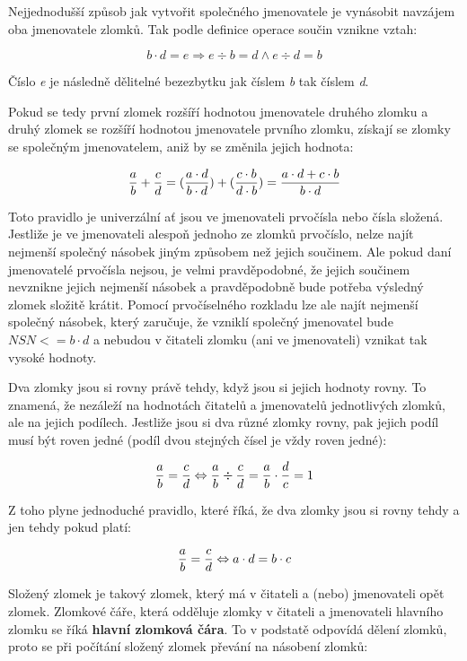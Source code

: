 Nejjednodušší způsob jak vytvořit společného jmenovatele je vynásobit navzájem oba jmenovatele zlomků. Tak podle definice operace součin vznikne vztah:

$$ b \cdot d = e \Rightarrow e \div b = d \wedge e \div d = b $$

Číslo {\it e} je následně dělitelné bezezbytku jak číslem {\it b} tak číslem {\it d}.

Pokud se tedy první zlomek rozšíří hodnotou jmenovatele druhého zlomku a druhý zlomek se rozšíří hodnotou jmenovatele prvního zlomku, získají se zlomky se společným jmenovatelem, aniž by se změnila jejich hodnota:

$$ {a \over b} + {c \over d} = ({a \cdot d \over b\cdot d}) + ({c \cdot b \over d \cdot b}) = {a \cdot d + c \cdot b \over b \cdot d}$$

Toto pravidlo je univerzální ať jsou ve jmenovateli prvočísla nebo čísla složená. Jestliže je ve jmenovateli alespoň jednoho ze zlomků prvočíslo, nelze najít nejmenší společný násobek jiným způsobem než jejich součinem. Ale pokud daní jmenovatelé prvočísla nejsou, je velmi pravděpodobné, že jejich součinem nevznikne jejich nejmenší násobek a pravděpodobně bude potřeba výsledný zlomek složitě krátit. Pomocí prvočíselného rozkladu lze ale najít nejmenší společný násobek, který zaručuje, že vzniklí společný jmenovatel bude $NSN <= b\cdot d$ a nebudou v čitateli zlomku (ani ve jmenovateli) vznikat tak vysoké hodnoty.


Dva zlomky jsou si rovny právě tehdy, když jsou si jejich hodnoty rovny. To znamená, že nezáleží na hodnotách čitatelů a jmenovatelů jednotlivých zlomků, ale na jejich podílech. Jestliže jsou si dva různé zlomky rovny, pak jejich podíl musí být roven jedné (podíl dvou stejných čísel je vždy roven jedné):

$$ {a \over b} = {c \over d} \Leftrightarrow  {a \over b} \div {c \over d} = {a \over b} \cdot {d \over c} = 1 $$

Z toho plyne jednoduché pravidlo, které říká, že dva zlomky jsou si rovny tehdy a jen tehdy pokud platí:

$$ {a \over b} = {c \over d} \Leftrightarrow a\cdot d = b \cdot c $$


Složený zlomek je takový zlomek, který má v čitateli a (nebo) jmenovateli opět zlomek. Zlomkové čáře, která odděluje zlomky v čitateli a jmenovateli  hlavního zlomku se říká {\bf hlavní zlomková čára}. To v podstatě odpovídá dělení zlomků, proto se při počítání složený zlomek převání na násobení zlomků:

